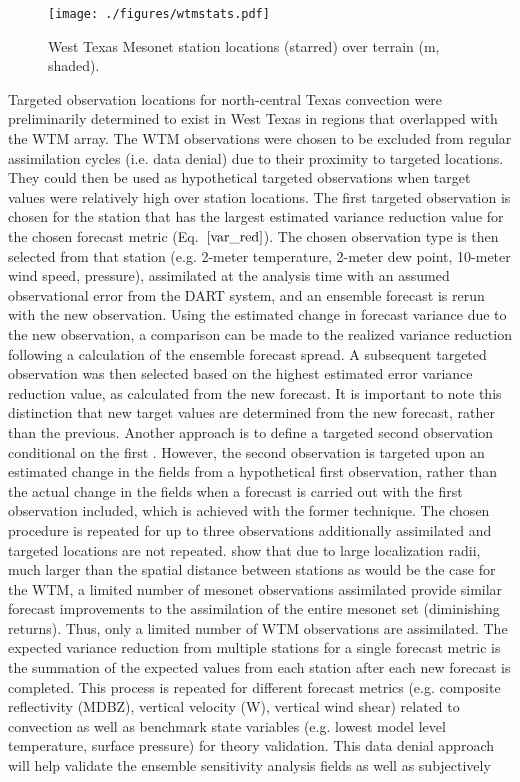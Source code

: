 \documentclass{ttuthes2007}
\newcommand{\tab}{\hspace*{2em}}  %
\begin{document}
\begin{figure}[!htb]
  \centering
  \noindent\texttt{[image: ./figures/wtmstats.pdf]}\\
  \caption{West Texas Mesonet station locations (starred) over terrain (m, shaded).}
\label{wtmstats}
\end{figure}

\tab Targeted observation locations for north-central Texas convection were preliminarily determined to exist in West Texas in regions that overlapped with the WTM array. The WTM observations were chosen to be excluded from regular assimilation cycles (i.e. data denial) due to their proximity to targeted locations. They could then be used as hypothetical targeted observations when target values were relatively high over station locations. The first targeted observation is chosen for the station that has the largest estimated variance reduction value for the chosen forecast metric (Eq.~$\ref{var_red}$). The chosen observation type is then selected from that station (e.g. 2-meter temperature, 2-meter dew point, 10-meter wind speed, pressure), assimilated at the analysis time with an assumed observational error from the DART system, and an ensemble forecast is rerun with the new observation. Using the estimated change in forecast variance due to the new observation, a comparison can be made to the realized variance reduction following a calculation of the ensemble forecast spread. A subsequent targeted observation was then selected based on the highest estimated error variance reduction value, as calculated from the new forecast. It is important to note this distinction that new target values are determined from the new forecast, rather than the previous. Another approach is to define a targeted second observation conditional on the first \citep{AncellandHakim2007a}. However, the second observation is targeted upon an estimated change in the fields from a hypothetical first observation, rather than the actual change in the fields when a forecast is carried out with the first observation included, which is achieved with the former technique. The chosen procedure is repeated for up to three observations additionally assimilated and targeted locations are not repeated. \cite{KnopfmeierandStensrud2013} show that due to large localization radii, much larger than the spatial distance between stations as would be the case for the WTM, a limited number of mesonet observations assimilated provide similar forecast improvements to the assimilation of the entire mesonet set (diminishing returns). Thus, only a limited number of WTM observations are assimilated. The expected variance reduction from multiple stations for a single forecast metric is the summation of the expected values from each station after each new forecast is completed. This process is repeated for different forecast metrics (e.g. composite reflectivity (MDBZ), vertical velocity (W), vertical wind shear) related to convection as well as benchmark state variables (e.g. lowest model level temperature, surface pressure) for theory validation. This data denial approach will help validate the ensemble sensitivity analysis fields \citep{TornandHakim2008a,Zacketal2011b,Torn2014} as well as subjectively 
\end{document}
